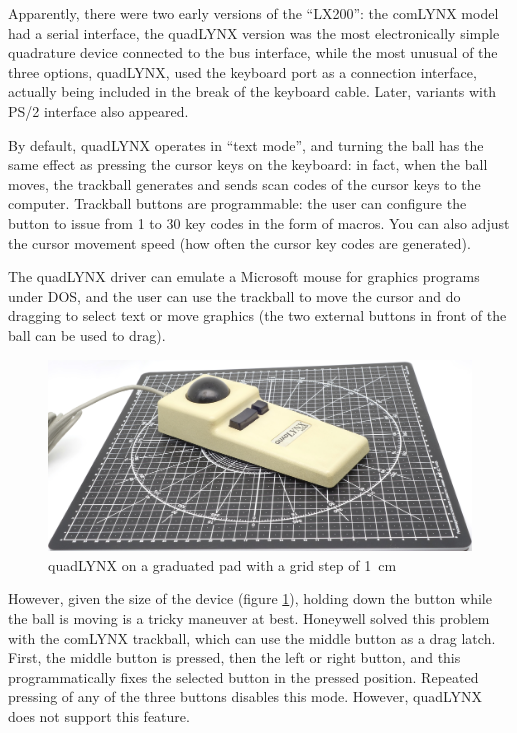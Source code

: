 \documentclass[11pt, a4paper]{article}
\begin{document}
Apparently, there were two early versions of the “LX200”: the comLYNX model had a serial \cite{comlynx} interface, the quadLYNX version was the most electronically simple quadrature device connected to the bus interface, while the most unusual of the three options, quadLYNX, used the keyboard port as a connection interface, actually being included in the break of the keyboard cable. Later, variants with PS/2 interface also appeared.

By default, quadLYNX operates in “text mode”, and turning the ball has the same effect as pressing the cursor keys on the keyboard: in fact, when the ball moves, the trackball generates and sends scan codes of the cursor keys to the computer. Trackball buttons are programmable: the user can configure the button to issue from 1 to 30 key codes in the form of macros. You can also adjust the cursor movement speed (how often the cursor key codes are generated).

The quadLYNX driver can emulate a Microsoft mouse for graphics programs under DOS, and the user can use the trackball to move the cursor and do dragging to select text or move graphics (the two external buttons in front of the ball can be used to drag).

\begin{figure}[h]
    \centering
    \includegraphics[scale=0.4]{1986_honeywell_asher_quadlynx_trackball/size_30.jpg}
    \caption{quadLYNX on a graduated pad with a grid step of 1~cm}
    \label{fig:quadLYNXSize}
\end{figure}

However, given the size of the device (figure \ref{fig:quadLYNXSize}), holding down the button while the ball is moving is a tricky maneuver at best. Honeywell solved this problem with the comLYNX trackball, which can use the middle button as a \cite{comlynx} drag latch. First, the middle button is pressed, then the left or right button, and this programmatically fixes the selected button in the pressed position. Repeated pressing of any of the three buttons disables this mode. However, quadLYNX does not support this feature.
\end{document}
